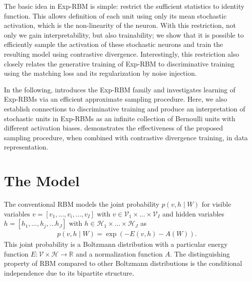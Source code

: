 \documentclass[twoside]{article}
\theoremstyle{plain}
\theoremstyle{definition}
\theoremstyle{remark}
\newcommand{\boldit}[1]{\ensuremath{#1}}
\newcommand{\sfit}[1]{\ensuremath{#1}}
\renewcommand{\Re}[0]{\ensuremath{\mathbb{R}}}%
\newcommand{\xx}[0]{\ensuremath{\boldit{v}}}%
\newcommand{\x}[0]{\ensuremath{{v}}}%
\newcommand{\yy}[0]{\ensuremath{\boldit{h}}}%
\newcommand{\y}[0]{\ensuremath{{h}}}%
\newcommand{\Y}[0]{\ensuremath{{H}}}%
\newcommand{\X}[0]{\ensuremath{{V}}}%
\newcommand{\WW}[0]{\ensuremath{\boldit{W}}}%
\newcommand{\pp}[0]{\ensuremath{\sfit{p}}}%
\newcommand{\ZZ}[0]{\ensuremath{\sfit{A}}}%
\newcommand{\energy}[0]{\ensuremath{E}}%
\begin{document}
The basic idea in Exp-RBM is simple: restrict the sufficient statistics to identity function. %
This allows definition of each unit using only its mean stochastic activation, which is the non-linearity of the neuron.
With this restriction, not only we gain interpretability, but also trainability; 
we show that it is possible to efficiently sample the activation of these stochastic neurons and train the resulting model using contrastive divergence.
Interestingly, this restriction also closely relates the generative training of Exp-RBM to  
 discriminative training using the matching loss and its regularization by noise injection.

In the following,  introduces the Exp-RBM family and
 investigates learning of Exp-RBMs via an efficient approximate sampling procedure. 
Here, we also establish connections to discriminative training and
produce an interpretation of stochastic units in Exp-RBMs as an infinite collection of 
Bernoulli units with different activation biases. 
 demonstrates the effectiveness of
the proposed sampling procedure, when combined with contrastive divergence training, in data representation.



\section{The Model}\label{sec:model}

The conventional RBM models the joint probability 
$\pp(\xx, \yy \mid \WW)$ for visible variables $\xx = [\x_1,\ldots,\x_i,\ldots,\x_I]$ with $\xx \in \mathcal{\X}_1 \times \ldots \times \mathcal{\X}_I $ and hidden variables $\yy = [\y_1,\ldots,\y_j,\ldots \y_J]$ with $\yy \in \mathcal{\Y}_1 \times \ldots\times \mathcal{\Y}_J$ as
\begin{align*}
\pp(\xx, \yy \mid \WW) = \exp(-\energy(\xx,\yy) - \ZZ(\WW)).
\end{align*}
This joint probability is a Boltzmann distribution with a particular energy function $\energy: \mathcal{\X} \times \mathcal{\Y} \to \Re$ and a normalization function $A$.
The distinguishing property of RBM compared to other Boltzmann distributions is the conditional independence due to its bipartite structure. 
\end{document}
